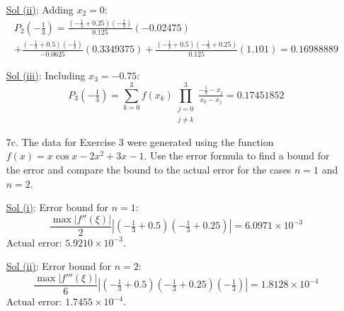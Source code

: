 \begin{enumerate}
    \underline{Sol (ii)}:
    Adding \( x_2 = 0 \):
    \[
      \begin{array}{l}
        P_2\left(-\tfrac{1}{3}\right) = \tfrac{(-\tfrac{1}{3} +
        0.25)(-\tfrac{1}{3})}{0.125} (-0.02475)\\ +
        \tfrac{(-\tfrac{1}{3} + 0.5)(-\tfrac{1}{3})}{-0.0625}
        (0.3349375) + \tfrac{(-\tfrac{1}{3} + 0.5)(-\tfrac{1}{3} +
        0.25)}{0.125} (1.101) = \boxed{0.16988889}
      \end{array}
    \]

    \underline{Sol (iii)}:
    Including \( x_3 = -0.75 \):
    \[
      P_3\left(-\tfrac{1}{3}\right) = \sum_{k=0}^3 f(x_k)
      \prod_{\substack{j=0 \\ j \neq k}}^3 \tfrac{-\tfrac{1}{3} -
      x_j}{x_k - x_j} = \boxed{0.17451852}
    \]

  \item[7c.] The data for Exercise 3 were generated using the
    function \( f(x) = x \cos x - 2x^2 + 3x - 1 \). Use the error
    formula to find a bound for the error and compare the bound to
    the actual error for the cases \( n = 1 \) and \( n = 2 \).

    \underline{Sol (i)}:
    Error bound for \( n=1 \):
    \[
      \frac{\max |f''(\xi)|}{2} \left|\left(-\tfrac{1}{3} +
      0.5\right)\left(-\tfrac{1}{3} + 0.25\right)\right| =
      \boxed{6.0971 \times 10^{-3}}
    \]
    Actual error: \( \boxed{5.9210 \times 10^{-3}} \).

    \underline{Sol (ii)}:
    Error bound for \( n=2 \):
    \[
      \frac{\max |f'''(\xi)|}{6} \left|\left(-\tfrac{1}{3} +
      0.5\right)\left(-\tfrac{1}{3} +
      0.25\right)\left(-\tfrac{1}{3}\right)\right| = \boxed{1.8128
      \times 10^{-4}}
    \]
    Actual error: \( \boxed{1.7455 \times 10^{-4}} \).

\end{enumerate}
